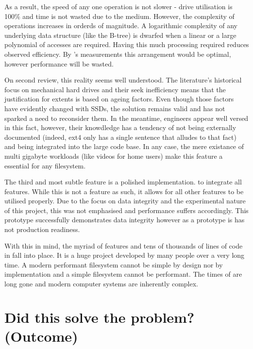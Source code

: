         As a result, the speed of any one operation is not slower - drive
        utilisation is 100\% and time is not wasted due to the medium. However,
        the complexity of operations increases in orderds of magnitude. A
        logarithmic complexity of any underlying data structure (like the
        B-tree) is dwarfed when a linear or a large polynomial of accesses are
        required. Having this much processing required reduces observed
        efficiency. By \citeauthor{FFS}'s measurements this arrangement would
        be optimal, however performance will be wasted.

        On second review, this reality seems well understood. The literature's
        historical focus on mechanical hard drives and their seek inefficiency
        means that the justification for extents is based on ageing factors.
        Even though those factors have evidently changed with SSDs, the
        solution remains valid and has not sparked a need to reconsider them.
        In the meantime, engineers appear well versed in this fact, however,
        their knowdledge has a tendency of not being externally documented
        (indeed, ext4 only has a single sentence that alludes to that fact) and
        being integrated into the large code base. In any case, the mere
        existance of multi gigabyte workloads (like videos for home users) make
        this feature a essential for any filesystem.

        The third and most subtle feature is a polished implementation.  to
        integrate all features. While this is not a feature as such, it allows
        for all other features to be utilised properly. Due to the focus on
        data integrity and the experimental nature of this project, this was
        not emphasised and performance suffers accordingly. This prototype
        successfully demonstrates data integrity however as a prototype is has
        not production readiness.

        With this in mind, the myriad of features and tens of thousands of
        lines of code in  fall into place. It is a huge
        project developed by many people over a very long time. A modern
        performant filesystem cannot be simple by design nor by implementation
        and a simple filesystem cannot be performant. The times of
         are long gone and modern computer systems are
        inherently complex.

    \section{Did this solve the problem? (Outcome)}


